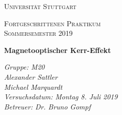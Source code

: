 \documentclass[aps,amsmath,amssymb,amsfont]{scrartcl}
\numberwithin{equation}{section}
\begin{document}
	\begin{titlepage}
	\centering
	\par\vspace{1cm}
	{\scshape\LARGE Universität Stuttgart \par}
	\vspace{1cm}
	{\scshape\Large  Fortgeschrittenen Praktikum \\ Sommersemester 2019\par}
	\vspace{1.5cm}
	{\huge\bfseries Magnetooptischer Kerr-Effekt\par}
	\vspace{2cm}
	{\Large\itshape Gruppe: M20\\ Alexander Sattler  \\  Michael Marquardt    \\ Versuchsdatum: Montag 8. Juli 2019\\ Betreuer: Dr. Bruno Gompf\\ \par}
	\end{titlepage}


\tableofcontents
\newpage





\printbibliography
\end{document}
